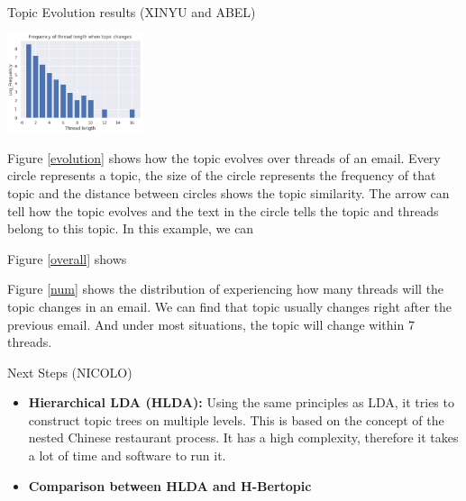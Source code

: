 \documentclass[final]{beamer}
\newlength{\colwidth}
\begin{document}
\begin{frame}[t]
\begin{columns}[t]
\begin{column}{\colwidth}
\begin{block}{Topic Evolution results (XINYU and ABEL)}
\begin{multicols}{2}
    \begin{center}
    \includegraphics[width=0.3\textwidth]{bertopic_topic_change_number.png}
    \label{num}
    \end{center}
\end{multicols}
    Figure \ref{evolution} shows how the topic evolves over threads of an email. Every circle represents a topic, the size of the circle represents the frequency of that topic and the distance between circles shows the topic similarity. The arrow can tell how the topic evolves and the text in the circle tells the topic and threads belong to this topic. In this example, we can 
    
    Figure \ref{overall} shows
    
    Figure \ref{num} shows the distribution of experiencing how many threads will the topic changes in an email. We can find that topic usually changes right after the previous email. And under most situations, the topic will change within 7 threads.

  \end{block}

  \begin{block}{Next Steps (NICOLO)}
      \begin{itemize}
          \item \textbf{Hierarchical LDA (HLDA):} Using the same principles as LDA, it tries to construct topic trees on multiple levels. This is based on the concept of the nested Chinese restaurant process. It has a high complexity, therefore it takes a lot of time and software to run it. 
          \item \textbf{Comparison between HLDA and H-Bertopic}
        \end{itemize}
    

\end{block}
\end{column}
\end{columns}
\end{frame}
\end{document}
